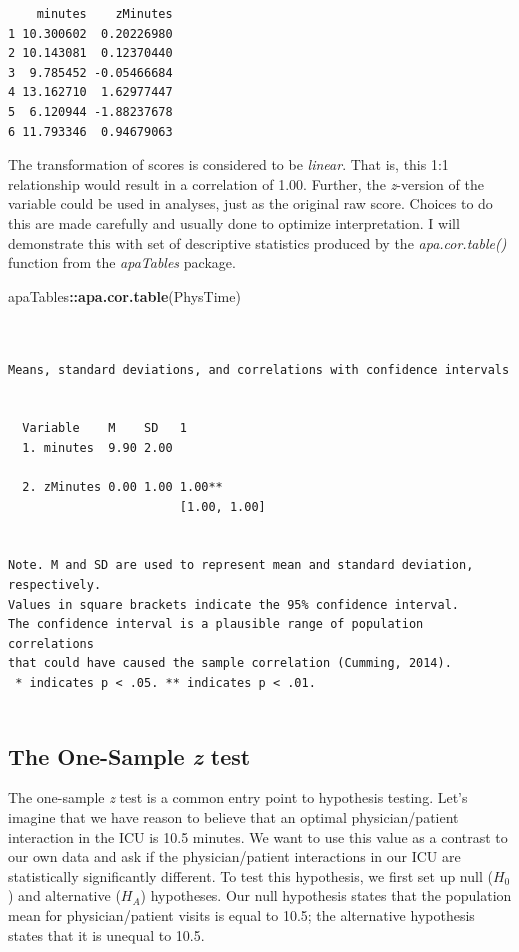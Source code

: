 \documentclass[
  11pt,
]{book}
\newenvironment{Shaded}{\begin{snugshade}}{\end{snugshade}}
\newcommand{\FunctionTok}[1]{\textcolor[rgb]{0.27,0.27,0.27}{\textbf{#1}}}
\newcommand{\NormalTok}[1]{#1}
\newcommand{\SpecialCharTok}[1]{\textcolor[rgb]{0.43,0.43,0.43}{\textbf{#1}}}
\begin{document}
\begin{verbatim}
    minutes    zMinutes
1 10.300602  0.20226980
2 10.143081  0.12370440
3  9.785452 -0.05466684
4 13.162710  1.62977447
5  6.120944 -1.88237678
6 11.793346  0.94679063
\end{verbatim}

The transformation of scores is considered to be \emph{linear}. That is, this 1:1 relationship would result in a correlation of 1.00. Further, the \emph{z}-version of the variable could be used in analyses, just as the original raw score. Choices to do this are made carefully and usually done to optimize interpretation. I will demonstrate this with set of descriptive statistics produced by the \emph{apa.cor.table()} function from the \emph{apaTables} package.

\begin{Shaded}
\begin{Highlighting}[]
\NormalTok{apaTables}\SpecialCharTok{::}\FunctionTok{apa.cor.table}\NormalTok{(PhysTime)}
\end{Highlighting}
\end{Shaded}

\begin{verbatim}


Means, standard deviations, and correlations with confidence intervals
 

  Variable    M    SD   1           
  1. minutes  9.90 2.00             
                                    
  2. zMinutes 0.00 1.00 1.00**      
                        [1.00, 1.00]
                                    

Note. M and SD are used to represent mean and standard deviation, respectively.
Values in square brackets indicate the 95% confidence interval.
The confidence interval is a plausible range of population correlations 
that could have caused the sample correlation (Cumming, 2014).
 * indicates p < .05. ** indicates p < .01.
 
\end{verbatim}

\hypertarget{the-one-sample-z-test}{%
\subsection{\texorpdfstring{The One-Sample \emph{z} test}{The One-Sample z test}}\label{the-one-sample-z-test}}

The one-sample \emph{z} test is a common entry point to hypothesis testing. Let's imagine that we have reason to believe that an optimal physician/patient interaction in the ICU is 10.5 minutes. We want to use this value as a contrast to our own data and ask if the physician/patient interactions in our ICU are statistically significantly different. To test this hypothesis, we first set up null (\(H_0\)) and alternative (\(H_A\)) hypotheses. Our null hypothesis states that the population mean for physician/patient visits is equal to 10.5; the alternative hypothesis states that it is unequal to 10.5.
\end{document}
